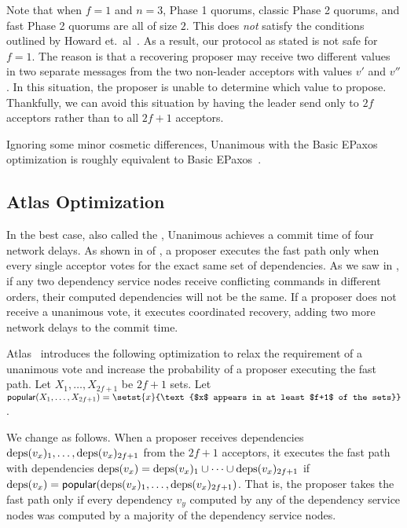 Note that when $f = 1$ and $n = 3$, Phase 1 quorums, classic Phase 2 quorums,
and fast Phase 2 quorums are all of size $2$. This does \emph{not} satisfy the
conditions outlined by Howard et.\ al~\cite{howard2021fast}. As a result, our
protocol as stated is not safe for $f=1$. The reason is that a recovering
proposer may receive two different values in two separate 
messages from the two non-leader acceptors with values $v'$ and $v''$. In this
situation, the proposer is unable to determine which value to propose.
Thankfully, we can avoid this situation by having the leader send only to $2f$
acceptors rather than to all $2f+1$ acceptors.

Ignoring some minor cosmetic differences, Unanimous \BPaxos{} with the Basic
EPaxos optimization is roughly equivalent to Basic
EPaxos~\cite{moraru2013there}.

\subsection{Atlas Optimization}
In the best case, also called the , Unanimous \BPaxos{}
achieves a commit time of four network delays. As shown in
 of , a proposer
executes the fast path only when every single acceptor votes for the exact same
set of dependencies. As we saw in , if any two dependency
service nodes receive conflicting commands in different orders, their computed
dependencies will not be the same. If a proposer does not receive a unanimous
vote, it executes coordinated recovery, adding two more network delays to the
commit time.

\newcommand{\popular}[1]{\textsf{popular}(#1)}
Atlas~\cite{enes2020state} introduces the following optimization to relax the
requirement of a unanimous vote and increase the probability of a proposer
executing the fast path. Let $X_1, \ldots, X_{2f+1}$ be $2f+1$ sets. Let
$\popular{X_1, \ldots, X_{2f+1}} = \setst{x}{\text{$x$ appears in at least
$f+1$ of the sets}}$.

We change  as follows. When a proposer receives
dependencies $\text{deps}(v_x)_1, \ldots, \text{deps}(v_x)_{2f+1}$ from the $2f+1$
acceptors, it executes the fast path with dependencies $\text{deps}(v_x) =
\text{deps}(v_x)_1 \cup \cdots \cup \text{deps}(v_x)_{2f+1}$ if $\deps{v_x} =
\popular{\deps{v_x}_1, \ldots, \deps{v_x}_{2f+1}}$. That is, the proposer takes
the fast path only if every dependency $v_y$ computed by any of the dependency
service nodes was computed by a majority of the dependency service nodes.

